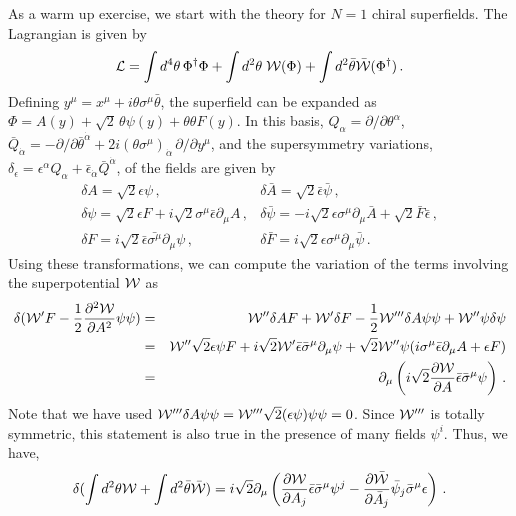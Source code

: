 As a warm up exercise, we start with the theory for $N=1$ chiral
superfields. The Lagrangian is given by 
$$
{\cal L}=\int d^4 \theta\,\Phi^\dagger\Phi +\int d^2 \theta \;
{\cal W}(\Phi) + \int d^2 \bar\theta \bar{\cal W}(\Phi^\dagger)\,.
$$
Defining $y^\mu=x^\mu + i \theta \sigma^\mu \bar{\theta}$, the
superfield can be expanded as $\Phi=A(y)+\sqrt{2}\,\theta\psi(y)
+\theta\theta F(y)$. In this basis, $Q_{\alpha}=\partial /
\partial\theta^{\alpha}$, $\bar{Q}_{\dot{\alpha}}=-
\partial/\partial\bar{\theta}^{\dot{\alpha}} + 2i
(\theta \sigma^\mu)_{\dot{\alpha}}\,\partial/\partial y^\mu$, and the
supersymmetry variations, $\delta_{\epsilon}=\epsilon^\alpha Q_\alpha +
\bar{\epsilon}_{\dot{\alpha}} \bar{Q}^{\dot{\alpha}}$, of the fields
are given by 
$$
\begin{array}{ll}
\delta A=\sqrt{2} \epsilon \psi\,,&
\delta\bar A=\sqrt{2} \bar{\epsilon}\bar{\psi}\,, \\
\delta\psi=\sqrt{2}\epsilon F + i\sqrt{2}\sigma^\mu
\bar{\epsilon} \partial_\mu A\,, &
\delta\bar{\psi}=-i\sqrt{2}\epsilon\sigma^\mu
\partial_\mu \bar{A}+\sqrt{2} \bar{F} \bar{\epsilon}\,, \\
\delta F=i\sqrt{2} \bar{\epsilon}\bar{\sigma^\mu}
\partial_\mu \psi\,, & \delta \bar{F}=i\sqrt{2}\epsilon 
\sigma^\mu \partial_\mu \bar{\psi}\,.
\end{array}
$$
Using these transformations, we can compute the variation of the terms
involving the superpotential ${\cal W}$ as  
\begin{eqnarray}
\delta ({\cal W}'F - \frac{1}{2} \frac{\partial^2 {\cal W}}{\partial
  A^2}\psi\psi) 
&=& {\cal W}''\delta AF+{\cal W}'\delta F-\frac{1}{2}{\cal W}'''\delta
A\psi\psi+{\cal W}'' \psi \delta \psi \nonumber\\
&=& {\cal W}''\sqrt{2}\epsilon\psi F+i\sqrt{2}{\cal W}'\bar{\epsilon}
\bar{\sigma}^\mu \partial_\mu \psi+\sqrt{2}{\cal W}''\psi(i\sigma^\mu 
\bar{\epsilon}\partial_\mu A + \epsilon F) \nonumber\\
&=&\partial_\mu \left( i \sqrt{2} \frac{\partial {\cal W}}{\partial A}
\bar{\epsilon} \bar{\sigma}^\mu \psi \right )\,.\nonumber
\end{eqnarray}
Note that we have used ${\cal W}'''\delta A\psi\psi={\cal W}'''
\sqrt{2}(\epsilon \psi)\psi\psi=0$. Since ${\cal W}'''$ is totally
symmetric, this statement is also true in the presence of many fields 
$\psi^i$. Thus, we have, 
$$
\delta (\int d^{2} \theta {\cal W} + \int d^{2} \bar{\theta}
\bar{{\cal W}})=i\sqrt{2}\partial_\mu\left(\frac{\partial {\cal W}}
{\partial A_j} \bar{\epsilon}\bar{\sigma}^\mu \psi^{j} -
\frac{\partial \bar{{\cal W}}}{\partial \bar{A}_j} \bar{\psi}_{j}
\bar{\sigma}^\mu \epsilon \right)\,.
$$
